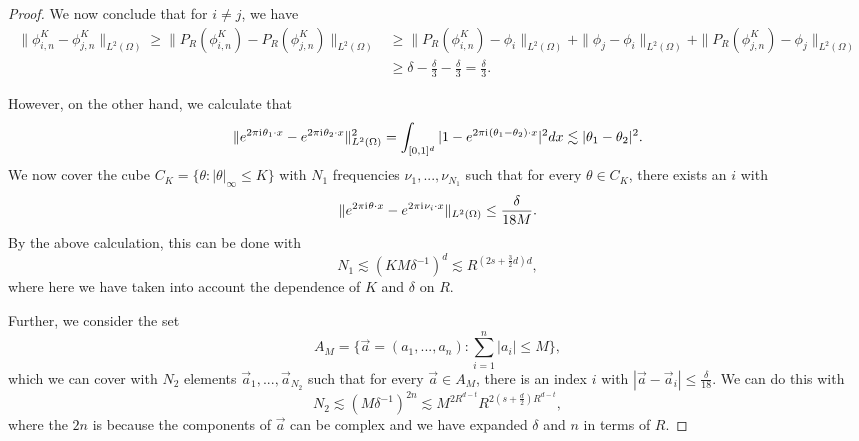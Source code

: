 \begin{proof}
 We now conclude that for $i\neq j$, we have
 \begin{equation}\label{eq_779}
 \begin{split}
  \|\phi_{i,n}^K - \phi_{j,n}^K\|_{L^2(\Omega)} \geq \|P_R(\phi_{i,n}^K) - P_R(\phi_{j,n}^K)\|_{L^2(\Omega)} &\geq \|P_R(\phi_{i,n}^K) - \phi_i\|_{L^2(\Omega)}
+ \|\phi_j - \phi_i\|_{L^2(\Omega)} + \|P_R(\phi_{j,n}^K) - \phi_j\|_{L^2(\Omega)}\\
& \geq \delta - \frac{\delta}{3} - \frac{\delta}{3} = \frac{\delta}{3}.
\end{split}
 \end{equation}
 
 However, on the other hand, we calculate that
 \begin{equation}
  \|e^{2\pi {\mathrm{i}\mkern1mu} \theta_1\cdot x} - e^{2\pi {\mathrm{i}\mkern1mu} \theta_2\cdot x}\|^2_{L^2(\Omega)} = \int_{[0,1]^d} |1 - e^{2\pi {\mathrm{i}\mkern1mu} (\theta_1 - \theta_2)\cdot x}|^2dx \lesssim |\theta_1 - \theta_2|^2.
 \end{equation}
 We now cover the cube $C_K = \{\theta:|\theta|_\infty \leq K\}$ with $N_1$ frequencies $\nu_1,...,\nu_{N_1}$ such that for every $\theta\in C_K$, there exists an $i$ with 
 \begin{equation}
 \|e^{2\pi {\mathrm{i}\mkern1mu} \theta\cdot x} - e^{2\pi {\mathrm{i}\mkern1mu} \nu_i\cdot x}\|_{L^2(\Omega)} \leq \frac{\delta}{18M}.
 \end{equation}
 By the above calculation, this can be done with
 \begin{equation}
  N_1\lesssim (KM\delta^{-1})^d \lesssim R^{(2s+\frac{3}{2}d)d},
 \end{equation}
 where here we have taken into account the dependence of $K$ and $\delta$ on $R$.
 
 Further, we consider the set $$A_M = \{\vec{a} = (a_1,...,a_n): \sum_{i=1}^n |a_i|\leq M\},$$
 which we can cover with $N_2$ elements $\vec{a}_1,...,\vec{a}_{N_2}$ such that for every $\vec{a}\in A_M$, there is an index $i$ with $|\vec{a} - \vec{a}_i| \leq \frac{\delta}{18}$. We can do this with
 \begin{equation}
  N_2 \lesssim (M\delta^{-1})^{2n}\lesssim M^{2R^{d-t}}R^{2(s+\frac{d}{2})R^{d-t}},
 \end{equation}
 where the $2n$ is because the components of $\vec{a}$ can be complex and we have expanded $\delta$ and $n$ in terms of $R$.


\end{proof}
